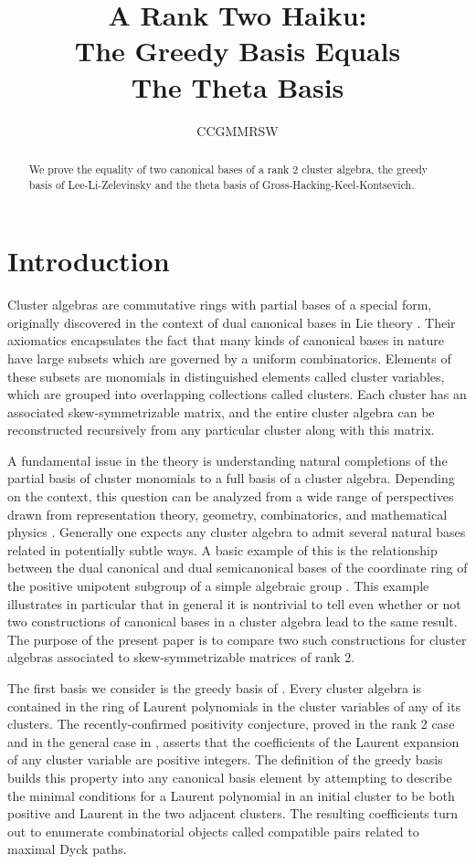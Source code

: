 \documentclass[11pt]{amsart}
\title[The Greedy Basis is the Theta Basis]{A Rank Two Haiku:\\ The Greedy Basis Equals \\ The Theta Basis}
\author{CCGMMRSW}
\theoremstyle{remark}
\numberwithin{equation}{section}
\begin{document}
\begin{abstract}
We prove the equality of two canonical bases of a rank 2 cluster algebra, the greedy basis of Lee-Li-Zelevinsky and the theta basis of Gross-Hacking-Keel-Kontsevich.
\end{abstract}

\maketitle

\section{Introduction}

Cluster algebras are commutative rings with partial bases of a special form, originally discovered in the context of dual canonical bases in Lie theory \cite{FZ}.  Their axiomatics encapsulates the fact that many kinds of canonical bases in nature have large subsets which are governed by a uniform combinatorics.  Elements of these subsets are monomials in distinguished elements called cluster variables, which are grouped into overlapping collections called clusters.  Each cluster has an associated skew-symmetrizable matrix, and the entire cluster algebra can be reconstructed recursively from any particular cluster along with this matrix.

A fundamental issue in the theory is understanding natural completions of the partial basis of cluster monomials to a full basis of a cluster algebra.  Depending on the context, this question can be analyzed from a wide range of perspectives drawn from representation theory, geometry, combinatorics, and mathematical physics \cite{Dup,KQ,FG,MSW,BZ,Rup,GMN}.  Generally one expects any cluster algebra to admit several natural bases related in potentially subtle ways.  A basic example of this is the relationship between the dual canonical and dual semicanonical bases of the coordinate ring of the positive unipotent subgroup of a simple algebraic group \cite{GLS}.  This example illustrates in particular that in general it is nontrivial to tell even whether or not two constructions of canonical bases in a cluster algebra lead to the same result.  The purpose of the present paper is to compare two such constructions for cluster algebras associated to skew-symmetrizable matrices of rank 2.  

The first basis we consider is the greedy basis of \cite{LLZ}.  Every cluster algebra is contained in the ring of Laurent polynomials in the cluster variables of any of its clusters.  The recently-confirmed positivity conjecture, proved in the rank 2 case \cite{LS,Rup2} and in the general case in \cite{LS2,GHKK}, asserts that the coefficients of the Laurent expansion of any cluster variable are positive integers.  The definition of the greedy basis builds this property into any canonical basis element by attempting to describe the minimal conditions for a Laurent polynomial in an initial cluster to be both positive and Laurent in the two adjacent clusters.  The resulting coefficients turn out to enumerate combinatorial objects called compatible pairs related to maximal Dyck paths.  
\end{document}
